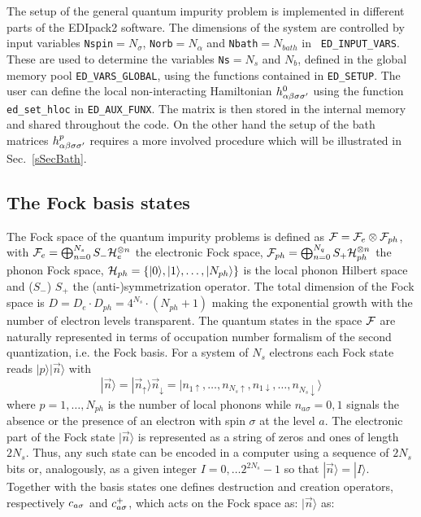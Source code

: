 \documentclass[final,3p,10pt]{elsarticle}
\newcommand{\secu}[1]
{Sec.~\ref{#1}}
\newcommand{\ket}[1]
{|#1\rangle}
\def\a{\alpha}       \def\b{\beta}   \def\g{\gamma}   \def\d{\delta}
\def\up{\uparrow} \def\down{\downarrow} \def\dw{\downarrow}
\def\NAME{{\rm EDIpack2 }}
\begin{document}
The setup of the general quantum impurity problem is implemented in
different parts of the \NAME software. The dimensions of the system
are controlled by input variables {\tt Nspin}$=N_\sigma$,
{\tt Norb}$=N_\a$ and {\tt Nbath}$=N_{bath}$ in {\tt
  ED\_INPUT\_VARS}. These are used to
determine the variables {\tt Ns}$=N_s$ and $N_b$, defined in the global
memory pool {\tt ED\_VARS\_GLOBAL}, using the functions contained
in {\tt ED\_SETUP}. 
The user can define the local non-interacting Hamiltonian
$h^0_{\a\b\s\s'}$ using the function {\tt ed\_set\_hloc} in {\tt ED\_AUX\_FUNX}.
The matrix is then stored in the internal memory and shared throughout the
code.
On the other hand the setup of the bath matrices $h^p_{\a\b\s\s'}$
requires a more involved procedure which will be illustrated in
\secu{sSecBath}. 


\subsection{The Fock basis states}\label{sSecBasis}
The Fock space of the quantum impurity problems is defined as
${\cal F}={\cal F}_e\otimes {\cal F}_{ph}$, with ${\cal F}_e=\bigoplus_{n=0}^{N_s}
S_-{\cal H}_e^{\otimes n}$ the electronic Fock space,  ${\cal F}_{ph}=\bigoplus_{n=0}^{N_q}S_+{\cal H}_{ph}^{\otimes n}$ the
phonon Fock space,  $\HH_{ph}=\{\ket{0},\ket{1},\dots,\ket{N_{ph}}\}$ is the local phonon Hilbert space
and ($S_-$)  $S_+$ the (anti-)symmetrization operator.  
The total dimension of the Fock space is
$D=D_e\cdot D_{ph}=4^{N_s}\cdot (N_{ph}+1)$ making the exponential
growth with the number of electron levels transparent. 
The quantum states in the space ${\cal F}$ are naturally represented in
terms of occupation number formalism of the second quantization,
i.e. the Fock basis.
For a system of $N_s$ electrons each Fock state
reads $\ket{p}\ket{\vec{n}}$ with
$$
\ket{\vec{n}}=\ket{\vec{n}_\up}{\vec{n}_\dw}=\ket{n_{1\up},\dots,n_{N_s\up},n_{1\dw},\dots,n_{N_s\dw}}
$$ 
where $p=1,\dots,N_{ph}$ is the number of local phonons while $n_{a\sigma}=0,1$ signals the absence or the
presence of an electron with spin $\sigma$ at the level $a$.
The electronic part of the Fock state $\ket{\vec{n}}$ is represented as a string of
zeros and ones of length $2N_s$. Thus, any such state can  be encoded
in a computer using a sequence of $2N_s$ bits or, analogously, as a
given integer $I=0,\dots 2^{2N_s}-1$ so that $\ket{\vec{n}}=\ket{I}$.  
Together with the basis states one defines  destruction and creation 
operators, respectively $c_{a\sigma}$ and $c^+_{a\sigma}$, which acts on the
Fock space as: 
$\ket{\vec{n}}$ as:  
\end{document}
